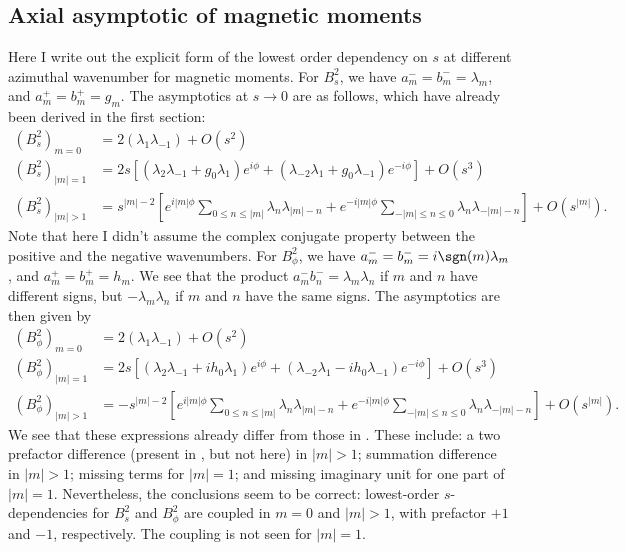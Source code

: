 \subsection{Axial asymptotic of magnetic moments}

Here I write out the explicit form of the lowest order dependency on $s$ at different azimuthal wavenumber for magnetic moments. For $B_s^2$, we have $a_m^- = b_m^- = \lambda_m$, and $a_m^+ = b_m^+ = g_m$. The asymptotics at $s\rightarrow 0$ are as follows, which have already been derived in the first section:
\begin{equation}
\begin{aligned}
    \left(B_s^2\right)_{m=0} &= 2(\lambda_1 \lambda_{-1}) + O\left(s^2\right) \\ 
    \left(B_s^2\right)_{|m|=1} &= 2 s \left[\left(\lambda_2 \lambda_{-1} + g_0 \lambda_1\right) e^{i\phi} + \left(\lambda_{-2} \lambda_{1} + g_0 \lambda_{-1}\right) e^{-i\phi}\right] + O\left(s^3\right) \\ 
    \left(B_s^2\right)_{|m|>1} &= s^{|m|-2} \left[e^{i|m|\phi} \sum_{0\leq n \leq |m|} \lambda_n \lambda_{|m|-n} + e^{-i|m|\phi} \sum_{-|m|\leq n\leq 0} \lambda_n \lambda_{-|m|-n}\right] + O\left(s^{|m|}\right).
\end{aligned}
\end{equation}
Note that here I didn't assume the complex conjugate property between the positive and the negative wavenumbers. For $B_\phi^2$, we have $a_m^- = b_m^- = i\sgn(m)\lambda_m$, and $a_m^+ = b_m^+ = h_m$. We see that the product $a_m^- b_n^- = \lambda_m \lambda_n$ if $m$ and $n$ have different signs, but $-\lambda_m \lambda_n$ if $m$ and $n$ have the same signs. The asymptotics are then given by
\begin{equation}
    \begin{aligned}
        \left(B_\phi^2\right)_{m=0} &= 2 (\lambda_1 \lambda_{-1}) + O\left(s^2\right) \\ 
        \left(B_\phi^2\right)_{|m|=1} &= 2 s \left[\left(\lambda_2 \lambda_{-1} + i h_0 \lambda_1\right) e^{i\phi} + \left(\lambda_{-2} \lambda_{1} - i h_0 \lambda_{-1}\right) e^{-i\phi}\right] + O\left(s^3\right) \\ 
        \left(B_\phi^2\right)_{|m|>1} &= -s^{|m|-2} \left[e^{i|m|\phi} \sum_{0\leq n \leq |m|} \lambda_n \lambda_{|m|-n} + e^{-i|m|\phi} \sum_{-|m|\leq n\leq 0} \lambda_n \lambda_{-|m|-n}\right] + O\left(s^{|m|}\right).
\end{aligned}
\end{equation}
We see that these expressions already differ from those in \textcite{holdenried-chernoff_long_2021}. These include: a two prefactor difference (present in \cite{holdenried-chernoff_long_2021}, but not here) in $|m| > 1$; summation difference in $|m| > 1$; missing terms for $|m|=1$; and missing imaginary unit for one part of $|m|=1$. Nevertheless, the conclusions seem to be correct: lowest-order $s$-dependencies for $B_s^2$ and $B_\phi^2$ are coupled in $m=0$ and $|m|>1$, with prefactor $+1$ and $-1$, respectively. The coupling is not seen for $|m|=1$.

